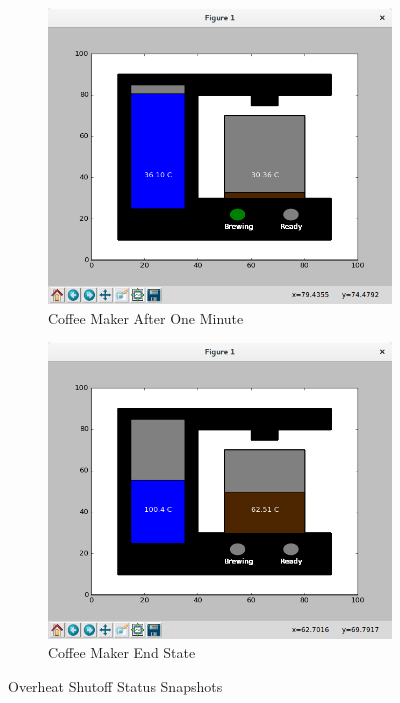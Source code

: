 \documentclass[10pt]{article}
\begin{document}
\begin{center}
  \begin{figure}[H]
    \begin{subfigure}{.5\textwidth}
      \centering
      \includegraphics[width=.8\linewidth]{input/test-3-prog}
      \caption{Coffee Maker After One Minute}
      \label{fig:test-3-prog}
    \end{subfigure}%
    \begin{subfigure}{.5\textwidth}
      \centering
      \includegraphics[width=.8\linewidth]{input/test-3}
      \caption{Coffee Maker End State}
      \label{fig:test-3}
    \end{subfigure}
  \caption{Overheat Shutoff Status Snapshots}
  \end{figure}
\end{center}
\end{document}
